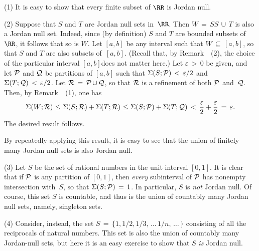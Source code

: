 \V

\hspace*{\parindent}(1) It is easy to show that every finite subset of ${\RR}$ is Jordan null.

\V

        (2) Suppose that $S$ and $T$ are Jordan null sets in~${\RR}$. Then $W \,=\, SS\,{\cup}\,T$ is also a Jordan null set.
    Indeed, since (by definition) $S$ and $T$ are bounded subsets of~${\RR}$, it follows that so is $W$. Let $[a,b]$ be any interval such that $W \,{\subseteq}\, [a,b]$,
    so that $S$ and $T$ are also subsets of~$[a,b]$. (Recall that, by Remark~~(2), the choice of the particular interval $[a,b]$does not matter here.)
    Let ${\varepsilon}\,>\,0$ be given, and let ${\cal P}$ and ${\cal Q}$ be partitions of $[a,b]$ such that ${\Sigma}(S;{\cal P})\,<\,{\varepsilon}/2$ and ${\Sigma}(T;{\cal Q})\,<\,{\varepsilon}/2$.
    Let ${\cal R} \,=\, {\cal P}\,{\cup}\,{\cal Q}$, so that ${\cal R}$ is a refinement of both ${\cal P}$ and~${\cal Q}$. Then, by Remark~~(1), one has
        \begin{displaymath}
        {\Sigma}(W;{\cal R})\,\,{\leq}\,\,{\Sigma}(S;{\cal R}) + {\Sigma}(T;{\cal R})
    \,\,{\leq}\,\,
        {\Sigma}(S;{\cal P}) + {\Sigma}(T;{\cal Q})
    \,<\,
        \frac{{\varepsilon}}{2} + \frac{{\varepsilon}}{2} \,=\, {\varepsilon}.
        \end{displaymath}
    The desired result follows.

        By repeatedly applying this result, it is easy to see that the union of finitely many Jordan null sets is also Jordan null.

\V

        (3) Let $S$ be the set of rational numbers in the unit interval $[0,1]$. It is clear that if ${\cal P}$ is any  partition of $[0,1]$,
    then {\em every} subinterval of ${\cal P}$ has nonempty intersection with~$S$, so that ${\Sigma}(S;{\cal P}) \,=\, 1$. In particular, $S$ is {\em not} Jordan null.
    Of course, this set $S$ is countable, and thus is the union of countably many Jordan null sets, namely, singleton sets.

\V

        (4) Consider, instead, the set $S \,=\, \{1,1/2,1/3,\,{\ldots}\,1/n,\,{\ldots}\,\}$ consisting of all the reciprocals of natural numbers.
    This set is also the union of countably many Jordan-null sets, but here it is an easy exercise to show that $S$ {\em is} Jordan null. %

